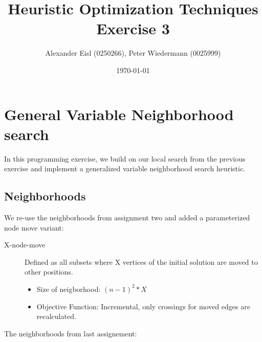 \documentclass{scrartcl}
\author{Alexander Eisl (0250266), Peter Wiedermann (0025999)}
\date{\today}
\title{Heuristic Optimization Techniques \\ Exercise 3}
\begin{document}
\maketitle


\section{General Variable Neighborhood search}
\label{sec:general_vns}

In this programming exercise, we build on our local search from the
previous exercise and implement a generalized variable neighborhood
search heuristic.




\subsection{Neighborhoods}
\label{neighborhoods}
We re-use the neighborhoods from assignment two and added a parameterized node move variant:

\begin{description}
\item[X-node-move] 
Defined as all subsets where X vertices of the initial solution are moved to other positions.

\begin{itemize}
\item Size of neigborhood: $(n-1)^2 * X $
\item Objective Function: Incremental, only crossings for moved edges are recalculated.
\end{itemize}

\end{description}
 
The neighborhoods from last assignement:
\end{document}
